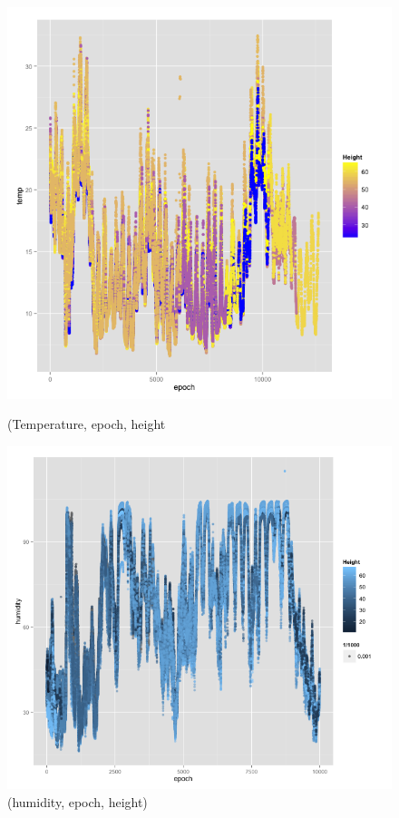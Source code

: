 \documentclass[english]{article}\usepackage[]{graphicx}\usepackage[]{color}
\begin{document}
\begin{figure}[H]
\centering
\begin{minipage}{.50\textwidth}
\centering
\includegraphics[width=\linewidth]{tempheight.png}
\caption{(Temperature, epoch, height}
\vspace{-10pt}
\end{minipage}\hfill
\begin{minipage}{.50\textwidth}
\centering
\includegraphics[width=\linewidth]{humidepoch}
\caption{(humidity, epoch, height)}
\vspace{-10pt}
\end{minipage}
\end{figure}
\end{document}
